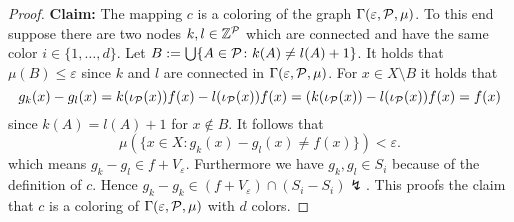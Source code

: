 \begin{proof}
  \textbf{Claim:} The mapping $c$ is a coloring of the graph $\Gamma(\varepsilon, \P, \mu)$. To this end suppose there are two nodes $k, l \in \Z^\P$ which are connected and have the same color $i \in \{1, \ldots, d\}$. Let $B := \bigcup\{A\in\P\colon k(A) \neq l(A) + 1\}$. It holds that $\mu(B) \leq \varepsilon$ since $k$ and $l$ are connected in $\Gamma(\varepsilon, \P, \mu)$. For $x \in X\setminus B$ it holds that
  \begin{equation*}
    g_k(x) - g_l(x) = k(\iota_\P(x))f(x) - l(\iota_\P(x))f(x) = (k(\iota_\P(x)) - l(\iota_\P(x)) f(x) = f(x)
  \end{equation*}
  since $k(A) = l(A) + 1$ for $x \notin B$. It follows that
  \begin{equation*}
    \mu(\{x\in X\colon g_k(x) - g_l(x) \neq f(x)\}) < \varepsilon.
  \end{equation*}
  which means $g_k - g_l \in f + V_\varepsilon$. Furthermore we have $g_k, g_l \in S_i$ because of the definition of $c$. Hence $g_k - g_k \in (f + V_\varepsilon) \cap (S_i - S_i) \lightning$.
  This proofs the claim that $c$ is a coloring of $\Gamma(\varepsilon,\P,\mu)$ with $d$ colors.
\end{proof}
